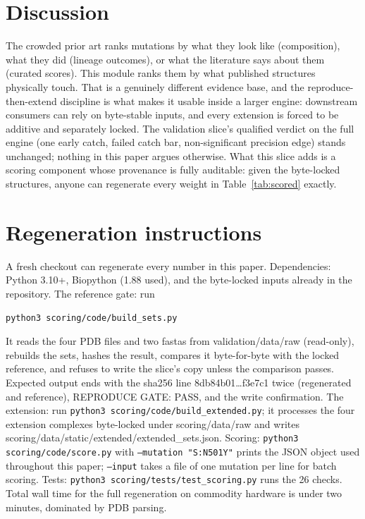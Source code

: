 \documentclass[11pt]{article}
\begin{document}
\section{Discussion}
The crowded prior art ranks mutations by what they look like (composition), what they did (lineage outcomes), or what the literature says about them (curated scores). This module ranks them by what published structures physically touch. That is a genuinely different evidence base, and the reproduce-then-extend discipline is what makes it usable inside a larger engine: downstream consumers can rely on byte-stable inputs, and every extension is forced to be additive and separately locked. The validation slice's qualified verdict on the full engine (one early catch, failed catch bar, non-significant precision edge) stands unchanged; nothing in this paper argues otherwise. What this slice adds is a scoring component whose provenance is fully auditable: given the byte-locked structures, anyone can regenerate every weight in Table~\ref{tab:scored} exactly.

\section{Regeneration instructions}
A fresh checkout can regenerate every number in this paper. Dependencies: Python 3.10+, Biopython (1.88 used), and the byte-locked inputs already in the repository. The reference gate: run
\begin{verbatim}
python3 scoring/code/build_sets.py
\end{verbatim}
It reads the four PDB files and two fastas from validation/data/raw (read-only), rebuilds the sets, hashes the result, compares it byte-for-byte with the locked reference, and refuses to write the slice's copy unless the comparison passes. Expected output ends with the sha256 line 8db84b01\ldots f3e7c1 twice (regenerated and reference), REPRODUCE GATE: PASS, and the write confirmation. The extension: run \texttt{python3 scoring/code/build\_\allowbreak extended.py}; it processes the four extension complexes byte-locked under scoring/data/raw and writes scoring/data/static/extended/extended\_sets.json. Scoring: \texttt{python3 scoring/code/}\allowbreak\texttt{score.py} with \texttt{--mutation "S:N501Y"} prints the JSON object used throughout this paper; \texttt{--input} takes a file of one mutation per line for batch scoring. Tests: \texttt{python3 scoring/tests/test\_scoring.py} runs the 26 checks. Total wall time for the full regeneration on commodity hardware is under two minutes, dominated by PDB parsing.
\end{document}
